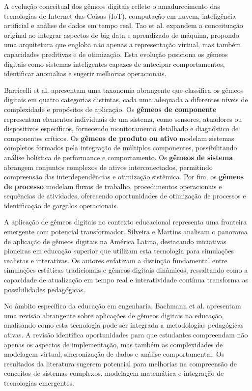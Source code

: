 \documentclass[12pt, a4paper, oneside]{abntex2}
\begin{document}
A evolução conceitual dos gêmeos digitais reflete o amadurecimento das tecnologias de Internet das Coisas (IoT), computação em nuvem, inteligência artificial e análise de dados em tempo real. Tao et al. \cite{tao2018} expandem a conceituação original ao integrar aspectos de big data e aprendizado de máquina, propondo uma arquitetura que engloba não apenas a representação virtual, mas também capacidades preditivas e de otimização. Esta evolução posiciona os gêmeos digitais como sistemas inteligentes capazes de antecipar comportamentos, identificar anomalias e sugerir melhorias operacionais.

Barricelli et al. \cite{barricelli2019} apresentam uma taxonomia abrangente que classifica os gêmeos digitais em quatro categorias distintas, cada uma adequada a diferentes níveis de complexidade e propósitos de aplicação. Os \textbf{gêmeos de componente} representam elementos individuais de um sistema, como sensores, atuadores ou dispositivos específicos, fornecendo monitoramento detalhado e diagnóstico de componentes críticos. Os \textbf{gêmeos de produto ou ativo} modelam sistemas completos formados pela integração de múltiplos componentes, possibilitando análise holística de performance e comportamento. Os \textbf{gêmeos de sistema} abrangem conjuntos complexos de ativos interconectados, permitindo compreensão das interdependências e otimização sistêmica. Por fim, os \textbf{gêmeos de processo} modelam fluxos de trabalho, procedimentos operacionais e sequências de atividades, oferecendo oportunidades de otimização de processos e identificação de gargalos operacionais.

A aplicação de gêmeos digitais no contexto educacional representa uma fronteira emergente com potencial transformador. Silveira e Martins \cite{silveira2024panorama} analisam o panorama de aplicação de gêmeos digitais na América Latina, destacando iniciativas pioneiras em educação superior que utilizam esta tecnologia para simulações realistas e interativas. Os autores enfatizam a distinção fundamental entre simulações estáticas tradicionais e gêmeos digitais dinâmicos, ressaltando como a capacidade de atualização em tempo real e interatividade contínua transforma as possibilidades pedagógicas.

No âmbito específico da educação em engenharia, Bachmann et al. \cite{bachmann2023} apresentam uma revisão abrangente sobre aplicações de gêmeos digitais na educação, analisando como esta tecnologia pode ser integrada a metodologias pedagógicas ativas. A revisão identifica oportunidades para que estudantes compreendam não apenas os aspectos de implementação, mas também as complexidades de modelagem virtual, sincronização de dados e análise comportamental. Os resultados da literatura sugerem potencial para melhorias na compreensão de conceitos de sistemas complexos, modelagem matemática e integração de tecnologias emergentes.
\end{document}
